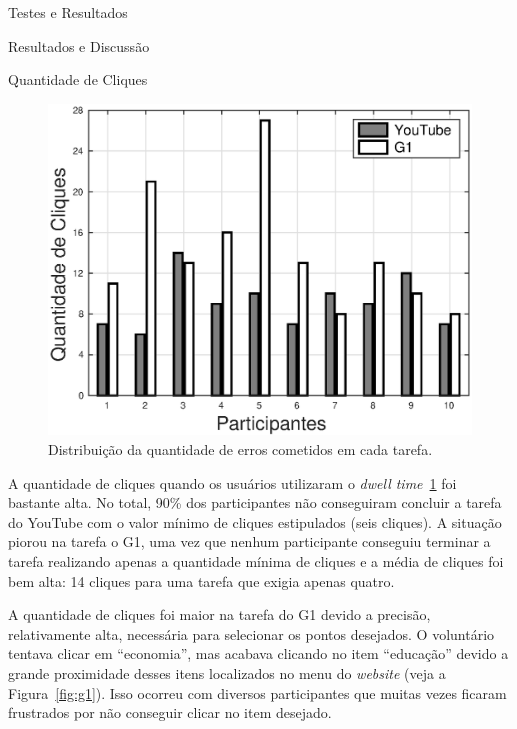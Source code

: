 \begin{chapter}{Testes e Resultados}
\begin{section}{Resultados e Discussão}
\begin{subsection}{Quantidade de Cliques}
\begin{figure}[!h]
	\centering
	\includegraphics[width=1.00\linewidth]{fig/DwellClicks}
	\caption{Distribuição da quantidade de erros cometidos em cada tarefa.}
	\label{fig:dwellclicks}
\end{figure}

A quantidade de cliques quando os usuários utilizaram o \textit{dwell
time}~\ref{fig:dwellclicks} foi bastante alta. No total, 90\% dos participantes
não conseguiram concluir a tarefa do YouTube com o valor mínimo de cliques
estipulados (seis cliques). A situação piorou na tarefa o G1, uma vez que nenhum
participante conseguiu terminar a tarefa realizando apenas a quantidade mínima
de cliques e a média de cliques foi bem alta: 14 cliques para uma tarefa que
exigia apenas quatro.

A quantidade de cliques foi maior na tarefa do G1 devido a precisão,
relativamente alta, necessária para selecionar os pontos desejados. O voluntário
tentava clicar em ``economia'', mas acabava clicando no item ``educação'' devido
a grande proximidade desses itens localizados no menu do \textit{website}
(veja a Figura~\ref{fig:g1}). Isso ocorreu com diversos participantes que muitas
vezes ficaram frustrados por não conseguir clicar no item desejado.


\end{subsection}
\end{section}
\end{chapter}
